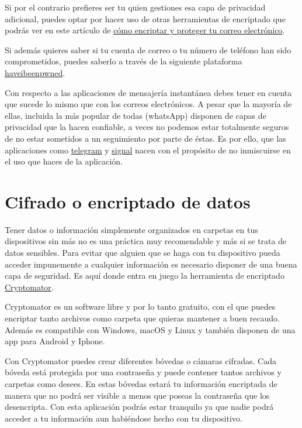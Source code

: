 \documentclass[
  spanish,
  a4paper,
  openany]{book}
\begin{document}
Si por el contrario prefieres ser tu quien gestiones esa capa de privacidad adicional, puedes optar por hacer uso de otras herramientas de encriptado que podrás ver en este artículo de \href{https://www.osi.es/es/actualidad/blog/2019/07/31/como-encriptar-y-proteger-tu-correo-electronico}{cómo encriptar y proteger tu correo electrónico}.

Si además quieres saber si tu cuenta de correo o tu número de teléfono han sido comprometidos, puedes saberlo a través de la siguiente plataforma \href{https://haveibeenpwned.com/}{haveibeenpwned}.

Con respecto a las aplicaciones de mensajería instantánea debes tener en cuenta que sucede lo mismo que con los correos electrónicos. A pesar que la mayoría de ellas, incluida la más popular de todas (whatsApp) disponen de capas de privacidad que la hacen confiable, a veces no podemos estar totalmente seguros de no estar sometidos a un seguimiento por parte de éstas. Es por ello, que las aplicaciones como \href{https://telegram.org/}{telegram} y \href{https://signal.org/es/}{signal} nacen con el propósito de no inmiscuirse en el uso que haces de la aplicación.

\hypertarget{cifrado-o-encriptado-de-datos}{%
\section{Cifrado o encriptado de datos}\label{cifrado-o-encriptado-de-datos}}

Tener datos o información simplemente organizados en carpetas en tus dispositivos sin más no es una práctica muy recomendable y más si se trata de datos sensibles. Para evitar que alguien que se haga con tu dispositivo pueda acceder impunemente a cualquier información es necesario disponer de una buena capa de seguridad. Es aquí donde entra en juego la herramienta de encriptado \href{https://cryptomator.org/}{Cryptomator}.

Cryptomator es un software libre y por lo tanto gratuito, con el que puedes encriptar tanto archivos como carpeta que quieras mantener a buen recaudo. Además es compatible con Windows, macOS y Linux y también disponen de una app para Android y Iphone.

Con Cryptomator puedes crear diferentes bóvedas o cámaras cifradas. Cada bóveda está protegida por una contraseña y puede contener tantos archivos y carpetas como desees. En estas bóvedas estará tu información encriptada de manera que no podrá ser visible a menos que poseas la contraseña que los desencripta. Con esta aplicación podrás estar tranquilo ya que nadie podrá acceder a tu información aun habiéndose hecho con tu dispositivo.
\end{document}
